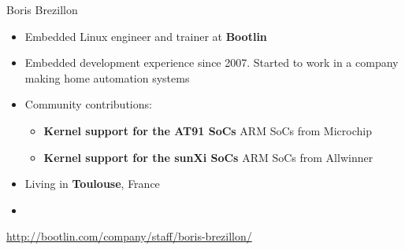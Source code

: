 \begin{frame}{Boris Brezillon}
    \begin{itemize}
	\item Embedded Linux engineer and trainer at {\bf Bootlin}
	\item Embedded development experience since 2007. Started
	      to work in a company making home automation systems
        \item Community contributions:
	\begin{itemize}
		\item {\bf Kernel support for the AT91 SoCs} ARM SoCs from Microchip
		\item {\bf Kernel support for the sunXi SoCs} ARM SoCs from Allwinner
	\end{itemize}
	\item Living in {\bf Toulouse}, France
	\item {}
    \end{itemize}
    {\small \url{http://bootlin.com/company/staff/boris-brezillon/}}
\end{frame}
